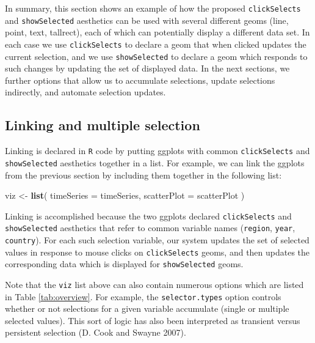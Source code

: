 \documentclass[12pt,]{article}
\newenvironment{Shaded}{\begin{snugshade}}{\end{snugshade}}
\newcommand{\DataTypeTok}[1]{\textcolor[rgb]{0.13,0.29,0.53}{#1}}
\newcommand{\KeywordTok}[1]{\textcolor[rgb]{0.13,0.29,0.53}{\textbf{#1}}}
\newcommand{\NormalTok}[1]{#1}
\newcommand{\StringTok}[1]{\textcolor[rgb]{0.31,0.60,0.02}{#1}}
\theoremstyle{definition}
\theoremstyle{definition}
\theoremstyle{definition}
\theoremstyle{remark}
\begin{document}
In summary, this section shows an example of how the proposed
\texttt{clickSelects} and \texttt{showSelected} aesthetics can be used
with several different geoms (line, point, text, tallrect), each of
which can potentially display a different data set. In each case we use
\texttt{clickSelects} to declare a geom that when clicked updates the
current selection, and we use \texttt{showSelected} to declare a geom
which responds to such changes by updating the set of displayed data. In
the next sections, we further options that allow us to accumulate
selections, update selections indirectly, and automate selection
updates.

\hypertarget{linking}{%
\subsection{Linking and multiple selection}\label{linking}}

Linking is declared in \texttt{R} code by putting ggplots with common
\texttt{clickSelects} and \texttt{showSelected} aesthetics together in a
list. For example, we can link the ggplots from the previous section by
including them together in the following list:

\begin{Shaded}
\begin{Highlighting}[]
\NormalTok{viz <-}\StringTok{ }\KeywordTok{list}\NormalTok{(}
  \DataTypeTok{timeSeries =}\NormalTok{ timeSeries,}
  \DataTypeTok{scatterPlot =}\NormalTok{ scatterPlot}
\NormalTok{)}
\end{Highlighting}
\end{Shaded}

Linking is accomplished because the two ggplots declared
\texttt{clickSelects} and \texttt{showSelected} aesthetics that refer to
common variable names (\texttt{region}, \texttt{year},
\texttt{country}). For each such selection variable, our system updates
the set of selected values in response to mouse clicks on
\texttt{clickSelects} geoms, and then updates the corresponding data
which is displayed for \texttt{showSelected} geoms.

Note that the \texttt{viz} list above can also contain numerous options
which are listed in Table \ref{tab:overview}. For example, the
\texttt{selector.types} option controls whether or not selections for a
given variable accumulate (single or multiple selected values). This
sort of logic has also been interpreted as transient versus persistent
selection (D. Cook and Swayne 2007).
\end{document}
